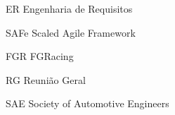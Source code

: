 \begin{siglas}
  \item[ER] Engenharia de Requisitos
  \item[SAFe] Scaled Agile Framework
  \item[FGR] FGRacing
  \item[RG] Reunião Geral
  \item[SAE] Society of Automotive Engineers
\end{siglas}
